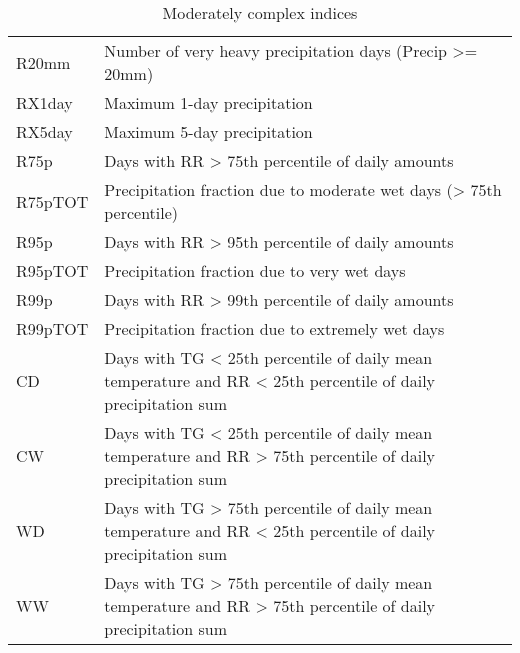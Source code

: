 \documentclass[a4paper,11pt]{article}
\begin{document}
\begin{table}[h]
\begin{tabular}{l p{10cm}}
    R20mm         &   Number of very heavy precipitation days (Precip >= 20mm)                                                       \\
    RX1day        &   Maximum 1-day precipitation                                                                                    \\
    RX5day        &   Maximum 5-day precipitation                                                                                    \\
    R75p          &   Days with RR > 75th percentile of daily amounts                                                                \\
    R75pTOT       &   Precipitation fraction due to moderate wet days (> 75th percentile)                                            \\
    R95p          &   Days with RR > 95th percentile of daily amounts                                                                \\
    R95pTOT       &   Precipitation fraction due to very wet days                                                                    \\
    R99p          &   Days with RR > 99th percentile of daily amounts                                                                \\
    R99pTOT       &   Precipitation fraction due to extremely wet days                                                               \\
    CD            &   Days with TG < 25th percentile of daily mean temperature and RR < 25th percentile of daily precipitation sum   \\
    CW            &   Days with TG < 25th percentile of daily mean temperature and RR > 75th percentile of daily precipitation sum   \\
    WD            &   Days with TG > 75th percentile of daily mean temperature and RR < 25th percentile of daily precipitation sum   \\
    WW            &   Days with TG > 75th percentile of daily mean temperature and RR > 75th percentile of daily precipitation sum   \\
    \end{tabular}
    \caption{Moderately complex indices}
    \label{table/moderate_indices}
    \end{table}
\end{document}
